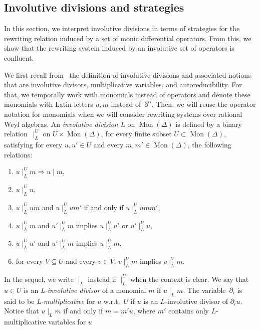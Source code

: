 \documentclass[11pt]{article}
\theoremstyle{definition}
\newcommand\wrt{w.r.t.}
\DeclareMathOperator{\Mon}{Mon}
\newcommand\divInv[1]{\mid_{#1}}
\begin{document}
\subsection{Involutive divisions and strategies}
\label{sec:involutive_divisions_and_strategies}

In this section, we interpret involutive divisions in terms of strategies
for the rewriting relation induced by a set of monic differential
operators. From this, we show that the rewriting system induced by an
involutive set of operators is confluent.
\medskip

We first recall from~\cite{MR1627129} the definition of involutive
divisions and associated notions that are involutive divisors,
multiplicative variables, and autoreducibility. For that, we temporally
work with monomials instead of operators and denote these monomials with
Latin letters $u,m$ instead of~$\partial^\alpha$. Then, we will reuse the
operator notation for monomials when we will consider rewriting systems
over rational Weyl algebras. An {\em involutive division} $L$ on
$\Mon(\Delta)$ is defined by a binary relation~$\divInv{L}^U$ on
$U\times\Mon(\Delta)$, for every finite subset $U\subset\Mon(\Delta)$,
satisfying for every $u,u'\in U$ and every $m,m'\in\Mon(\Delta)$, the
following relations:
\begin{enumerate}[label=\alph*)]
\item\label{it:div} $u\divInv{L}^Um\Rightarrow u\mid m$,
\item\label{it:unit} $u\divInv{L}^Uu$,
\item\label{it:mul} $u\divInv{L}^Uum$ and $u\divInv{L}^Uum'$ if and only
  if $u\divInv{L}^Uumm'$,
\item\label{it:vertex} $u\divInv{L}^Um$ and $u'\divInv{L}^Um$ implies
  $u\divInv{L}^Uu'$ or $u'\divInv{L}^Uu$,
\item\label{it:transitivity} $u\divInv{L}^Uu'$ and $u'\divInv{L}^Um$
  implies $u\divInv{L}^Um$,
\item\label{it:filter} for every $V\subseteq U$ and every $v\in V$,
  $v\divInv{L}^Um$ implies $v\divInv{L}^Vm$. 
\end{enumerate}
In the sequel, we write $\divInv{L}$ instead if $\divInv{L}^U$ when the
context is clear. We say that $u\in U$ is an {\em L-involutive divisor}
of a monomial $m$ if $u\divInv{L}m$. The variable~$\partial_i$ is said to be
{\em L-multiplicative} for $u$ \wrt\ $U$ if $u$ is an $L$-involutive
divisor of $\partial_iu$. Notice that $u\divInv{L}m$ if and only if
$m=m'u$, where $m'$ contains only $L$-multiplicative variables for $u$
\end{document}
